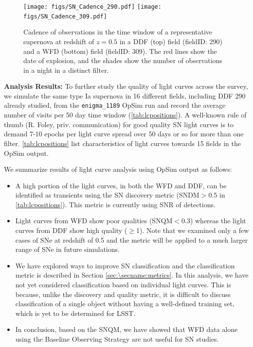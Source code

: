 \begin{figure}
\centering
\texttt{[image: figs/SN\_Cadence\_290.pdf]}
\texttt{[image: figs/SN\_Cadence\_309.pdf]}
\caption{Cadence of observations in the time window of a representative
supernova at redshift of $z=0.5$ in a DDF (top) field (fieldID: 290) and
a WFD (bottom) field (fieldID: 309). The red lines show the date of
explosion, and the shades show the number of observations in a night in
a distinct filter.}
\label{fig:perSNCadence}
\end{figure}

{\bf Analysis Results:}
To further study the quality of light curves across the survey, we simulate the same type Ia
supernova in 16 different fields, including DDF 290 already studied, from the \texttt{enigma\_1189}
OpSim run and record the average number of visits per 50 day time window
(\autoref{tab:lcpositions}). A well-known rule of thumb (R. Foley, priv. communication) for good
quality SN light curves is to
demand 7-10 epochs per light curve spread over 50 days or so for more than one filter.
\autoref{tab:lcpositions} list characteristics of light curves towards 15 fields in the OpSim
output.

We summarize results of light curve analysis using OpSim output as follows:
\begin{itemize}
\item A high portion of the light curves, in both the WFD and DDF, can be identified as transients
using  the SN
discovery metric (SNDM$>$0.5 in \autoref{tab:lcpositions}).
This metric is currently using SNR of detections.
\item Light curves from WFD show poor qualities (SNQM$<$0.3) whereas the light curves from DDF show
high quality ($\geq$1). Note that we examined only a few cases of SNe at redshift of 0.5 and the
metric will be applied to a much larger range of SNe in future simulations.
\item We have explored ways to improve SN classification \citep{Lochner2016} and the classification
metric is described in Section
\ref{sec:\secname:metrics}.
In this analysis, we have not yet considered classification based on individual light curves.
This is because, unlike the discovery and quality metric, it is difficult to discuss
classification of a single object without having a well-defined training set, which is yet to be
determined for LSST.
\item In conclusion, based on the SNQM, we have showed that WFD data alone using the Baseline
Observing Strategy are not useful for SN studies.
\end{itemize}


